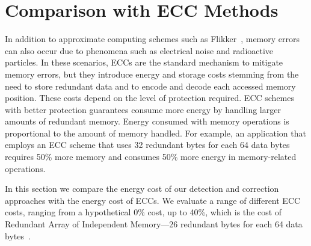 \documentclass[letterpaper]{article}
\begin{document}
\section{Comparison with ECC Methods}

In addition to approximate computing schemes such as Flikker~\cite{Liu:2011:FSD:1950365.1950391}, memory errors can also occur due to phenomena such as electrical noise and radioactive particles. %
In these scenarios, ECCs are the standard mechanism to mitigate memory errors, but they introduce energy and storage costs stemming from the need to store redundant data and to encode and decode each accessed memory position. These costs depend on the level of protection required. ECC schemes with better protection guarantees consume more energy by handling larger amounts of redundant memory. Energy consumed with memory operations is proportional to the amount of memory handled. For example, an application that employs an ECC scheme that uses 32 redundant bytes for each 64 data bytes requires 50\% more memory and consumes 50\% more energy in memory-related operations.



In this section we compare the energy cost of our detection and correction approaches with the energy cost of ECCs.
We evaluate a range of different ECC costs, ranging from a hypothetical 0\% cost, up to 40\%, which is the cost of Redundant Array of Independent Memory---26 redundant bytes for each 64 data bytes~\cite{6136239}. %
\end{document}
